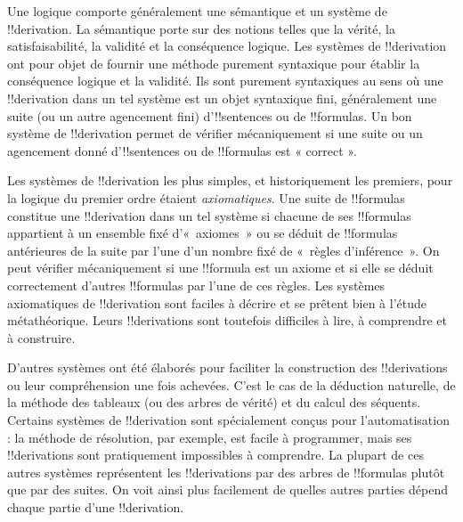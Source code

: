 \documentclass[../../../include/open-logic-section]{subfiles}
\begin{document}
      {}
      {}


Une logique comporte généralement une sémantique et un système de
!!{derivation}. La sémantique porte sur des notions telles que la vérité,
la satisfaisabilité, la validité et la conséquence logique. Les systèmes
de !!{derivation} ont pour objet de fournir une méthode purement
syntaxique pour établir la conséquence logique et la validité. Ils sont
purement syntaxiques au sens où une !!{derivation} dans un tel système
est un objet syntaxique fini, généralement une suite (ou un autre
agencement fini) d'!!{sentence}s ou de !!{formula}s. Un bon système de
!!{derivation} permet de vérifier mécaniquement si une suite ou un
agencement donné d'!!{sentence}s ou de !!{formula}s est « correct ».

Les systèmes de !!{derivation} les plus simples, et historiquement les
premiers, pour la logique du premier ordre étaient \emph{axiomatiques}.
Une suite de !!{formula}s constitue une !!{derivation} dans un tel
système si chacune de ses !!{formula}s appartient à un ensemble fixé
d'«~axiomes~» ou se déduit de !!{formula}s antérieures de la suite par
l'une d'un nombre fixé de «~règles d'inférence~». On peut vérifier
mécaniquement si une !!{formula} est un axiome et si elle se déduit
correctement d'autres !!{formula}s par l'une de ces règles. Les systèmes
axiomatiques de !!{derivation} sont faciles à décrire et se prêtent bien
à l'étude métathéorique. Leurs !!{derivation}s sont toutefois difficiles
à lire, à comprendre et à construire.

D'autres systèmes ont été élaborés pour faciliter la construction des
!!{derivation}s ou leur compréhension une fois achevées. C'est le cas de
la déduction naturelle, de la méthode des tableaux (ou des arbres de
vérité) et du calcul des séquents. Certains systèmes de
!!{derivation} sont spécialement conçus pour l'automatisation : la méthode
de résolution, par exemple, est facile à programmer, mais ses
!!{derivation}s sont pratiquement impossibles à comprendre. La plupart
de ces autres systèmes représentent les !!{derivation}s par des arbres
de !!{formula}s plutôt que par des suites. On voit ainsi plus facilement
de quelles autres parties dépend chaque partie d'une !!{derivation}.
\end{document}

